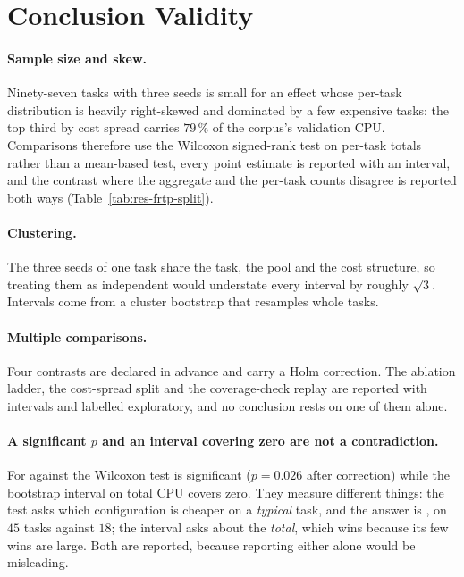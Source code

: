 \section{Conclusion Validity}

\paragraph{Sample size and skew.} Ninety-seven tasks with three seeds is small
for an effect whose per-task distribution is heavily right-skewed and dominated
by a few expensive tasks: the top third by cost spread carries $79\,\%$ of the
corpus's validation CPU. Comparisons therefore use the Wilcoxon signed-rank
test on per-task totals rather than a mean-based test, every point estimate is
reported with an interval, and the contrast where the aggregate and the
per-task counts disagree is reported both ways
(Table~\ref{tab:res-frtp-split}).

\paragraph{Clustering.} The three seeds of one task share the task, the pool
and the cost structure, so treating them as independent would understate every
interval by roughly $\sqrt{3}$. Intervals come from a cluster bootstrap that
resamples whole tasks.

\paragraph{Multiple comparisons.} Four contrasts are declared in advance and
carry a Holm correction. The ablation ladder, the cost-spread split and the
coverage-check replay are reported with intervals and labelled exploratory, and
no conclusion rests on one of them alone.

\paragraph{A significant $p$ and an interval covering zero are not a
contradiction.} For  against  the Wilcoxon test is
significant ($p = 0.026$ after correction) while the bootstrap interval on
total CPU covers zero. They measure different things: the test asks which
configuration is cheaper on a \emph{typical} task, and the answer is \frtp, on
$45$ tasks against $18$; the interval asks about the \emph{total}, which
 wins because its few wins are large. Both are reported, because
reporting either alone would be misleading.
